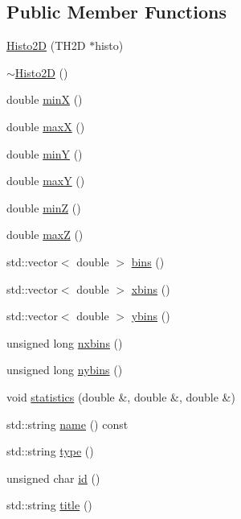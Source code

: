 \subsection*{Public Member Functions}
\begin{DoxyCompactItemize}
\item 
\hyperlink{classHisto2D_acdeb6b732d7b596dea8a282813cd1c18}{Histo2D} (TH2D $\ast$histo)
\item 
\hyperlink{classHisto2D_a4df8112579be6bc1d5652933c73125ae}{$\sim$Histo2D} ()
\item 
double \hyperlink{classHisto2D_ae5a3ff63669999c9fda448db61e5bb57}{minX} ()
\item 
double \hyperlink{classHisto2D_aae04c13ac492562532b4d3f82979a0f4}{maxX} ()
\item 
double \hyperlink{classHisto2D_ae946ecc8e7b4efc2e1454cd75c7d8aca}{minY} ()
\item 
double \hyperlink{classHisto2D_a7bfc748b81257716316a38e628c5832f}{maxY} ()
\item 
double \hyperlink{classHisto2D_a68cfc2d92fbc5ce2efa1d6b5781ea621}{minZ} ()
\item 
double \hyperlink{classHisto2D_ad6ccf8ddd4e4b5930f39284059577570}{maxZ} ()
\item 
std::vector$<$ double $>$ \hyperlink{classHisto2D_ab3d44a1cb12119a2244065af2b1f7099}{bins} ()
\item 
std::vector$<$ double $>$ \hyperlink{classHisto2D_a8f42529a5fba07c339e547bf504dd418}{xbins} ()
\item 
std::vector$<$ double $>$ \hyperlink{classHisto2D_a0ae225e33eb9837137b10a159ac1d4f2}{ybins} ()
\item 
unsigned long \hyperlink{classHisto2D_aac422991db96030ce7ca3952e4d277f2}{nxbins} ()
\item 
unsigned long \hyperlink{classHisto2D_a17ee49d9e1c5d62edc887f4f63f68db6}{nybins} ()
\item 
void \hyperlink{classHisto2D_a66875cb46a7e5ff6fa347fe736cbed1b}{statistics} (double \&, double \&, double \&)
\item 
std::string \hyperlink{classObject_a975e888d50bfcbffda2c86368332a5cd}{name} () const 
\item 
std::string \hyperlink{classObject_a84f99f70f144a83e1582d1d0f84e4e62}{type} ()
\item 
unsigned char \hyperlink{classObject_af99145335cc61ff6e2798ea17db009d2}{id} ()
\item 
std::string \hyperlink{classObject_a73a0f1a41828fdd8303dd662446fb6c3}{title} ()

\end{DoxyCompactItemize}
